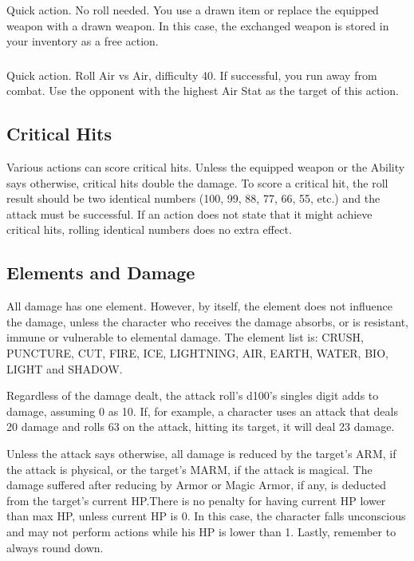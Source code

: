 \begin{multicols}{2}
\subsubsection{}
Quick action. No roll needed. You use a drawn item or replace the equipped weapon with a drawn weapon. In this case, the exchanged weapon is stored in your inventory as a free action.

\subsubsection{}
Quick action. Roll Air vs Air, difficulty 40. If successful, you run away from combat. Use the opponent with the highest Air Stat as the target of this action.

\subsection{Critical Hits}
Various actions can score critical hits. Unless the equipped weapon or the Ability says otherwise, critical hits double the damage. To score a critical hit, the roll result should be two identical numbers (100, 99, 88, 77, 66, 55, etc.) and the attack must be successful. If an action does not state that it might achieve critical hits, rolling identical numbers does no extra effect.

\begin{center}
\end{center}

\subsection{Elements and Damage}
All damage has one element. However, by itself, the element does not influence the damage, unless the character who receives the damage absorbs, or is resistant, immune or vulnerable to elemental damage. The element list is: CRUSH, PUNCTURE, CUT, FIRE, ICE, LIGHTNING, AIR, EARTH, WATER, BIO, LIGHT and SHADOW.\@{}%

Regardless of the damage dealt, the attack roll’s d100’s singles digit adds to damage, assuming 0 as 10. If, for example, a character uses an attack that deals 20 damage and rolls 63 on the attack, hitting its target, it will deal 23 damage.

Unless the attack says otherwise, all damage is reduced by the target's ARM, if the attack is physical, or the target’s MARM, if the attack is magical. The damage suffered after reducing by Armor or Magic Armor, if any, is deducted from the target’s current HP.\@{}There is no penalty for having current HP lower than max HP, unless current HP is 0. In this case, the character falls unconscious and may not perform actions while his HP is lower than 1. Lastly, remember to always round down.


\end{multicols}
